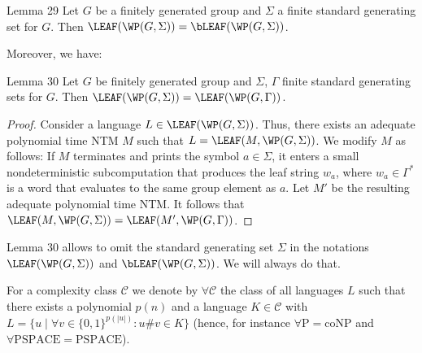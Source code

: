 \begin{authorclaim}{Lemma 29} \label{lemma-JMT}
Let $G$ be a finitely generated group and $\Sigma$ a finite standard generating set for $G$. 
Then $\LEAF(\WP(G,\Sigma))  = \bLEAF(\WP(G,\Sigma))$. 
\end{authorclaim}

Moreover, we have:
\begin{authorclaim}{Lemma 30} \label{lemma-f.g.set-not-important}
Let $G$ be finitely generated group and $\Sigma$, $\Gamma$ finite standard generating sets for $G$. 
Then $\LEAF(\WP(G,\Sigma))  = \LEAF(\WP(G,\Gamma))$. 
\end{authorclaim}

\begin{proof}
Consider a language $L \in \LEAF(\WP(G,\Sigma))$. Thus, there exists an adequate polynomial time
 NTM $M$ such that $L = \LEAF(M,\WP(G,\Sigma))$. We modify $M$ as follows: If $M$ terminates and prints
 the symbol $a \in \Sigma$, it enters a small nondeterministic subcomputation that produces the leaf string $w_a$,
 where $w_a \in \Gamma^*$ is a word that evaluates to the same group element as $a$. Let $M'$ be the resulting
 adequate polynomial time NTM.
 It follows that $\LEAF(M,\WP(G,\Sigma)) =  \LEAF(M',\WP(G,\Gamma))$.
\end{proof}
Lemma 30 allows to omit the standard generating set $\Sigma$ in the notations
$\LEAF(\WP(G,\Sigma))$ and $\bLEAF(\WP(G,\Sigma))$. We will always do that.

For a complexity class $\mathcal C$ we denote by $\forall\mathcal C$ the class of all languages $L$ such that there exists a polynomial $p(n)$ and a language $K\in\mathcal C$ with $L=\{u\mid\forall v\in\{0,1\}^{p(|u|)}:u\#v\in K\}$ (hence, for instance $\forall\mathrm P=\mathrm{coNP}$ and $\forall\mathrm{PSPACE}=\mathrm{PSPACE}$).
